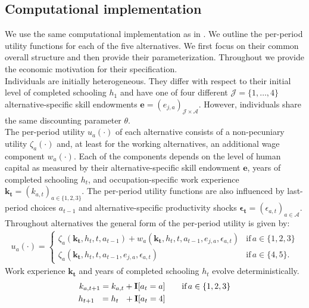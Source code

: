 \subsection{Computational implementation}\label{Computational implementation}
We use the same computational implementation as in \citet{Keane.1997}. We outline the per-period utility functions for each of the five alternatives. We first focus on their common overall structure and then provide their parameterization. Throughout we provide the economic motivation for their specification.\\

\noindent Individuals are initially heterogeneous. They differ with respect to their initial level of completed schooling $h_1$ and have one of four different $\mathcal{J} = \{1, \hdots, 4\}$ alternative-specific skill endowments $\bm{e} = \left(e_{j,a}\right)_{\mathcal{J} \times \mathcal{A}}$. However, individuals share the same discounting parameter $\theta$. \\

\noindent The per-period utility $u_a(\cdot)$ of each alternative consists of a non-pecuniary utility $\zeta_a(\cdot)$ and, at least for the working alternatives, an additional wage component $w_a(\cdot)$. Each of the components depends on the level of human capital as measured by their alternative-specific skill endowment $\bm{e}$, years of completed schooling $h_t$, and occupation-specific work experience $\bm{k_t} = \left(k_{a,t}\right)_{a\in\{1, 2, 3\}}$. The per-period utility functions are also influenced by last-period choices $a_{t -1}$ and alternative-specific productivity shocks $\bm{\epsilon_t} = \left(\epsilon_{a,t}\right)_{a\in\mathcal{A}}$. Throughout alternatives the general form of the per-period utility is given by:
%
\begin{align*}
u_a(\cdot) =
\begin{cases}
    \zeta_a(\bm{k_t}, h_t, t, a_{t -1})  + w_a(\bm{k_t}, h_t, t, a_{t -1}, e_{j, a}, \epsilon_{a,t})                & \text{if}\, a \in \{1, 2, 3\}  \\
    \zeta_a(\bm{k_t}, h_t, t, a_{t-1}, e_{j,a}, \epsilon_{a,t})                                                  &  \text{if}\, a \in \{4, 5\}.
\end{cases}
\end{align*}
%
Work experience $\bm{k_t}$  and years of completed schooling $h_t$ evolve deterministically.
%
\begin{align*}
k_{a,t+1} = k_{a,t} + {\textbf{I}}[a_t = a]  &\qquad \text{if}\, a \in \{1, 2, 3\} \\
h_{t + 1\phantom{,a}} = h_{t\phantom{,a}} +   {\textbf{I}}[a_t = 4]  &\qquad
\end{align*}
